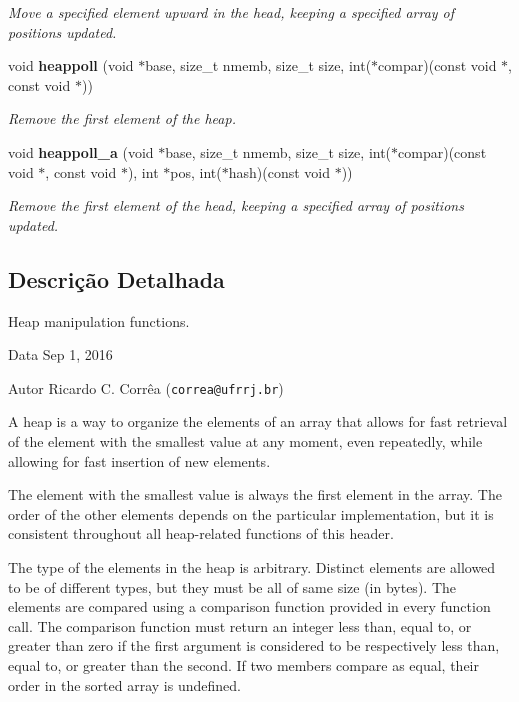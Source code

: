 \begin{DoxyCompactItemize}
\begin{DoxyCompactList}\small\item\em Move a specified element upward in the head, keeping a specified array of positions updated. \end{DoxyCompactList}\item 
void {\bf heappoll} (void $\ast$base, size\+\_\+t nmemb, size\+\_\+t size, int($\ast$compar)(const void $\ast$, const void $\ast$))
\begin{DoxyCompactList}\small\item\em Remove the first element of the heap. \end{DoxyCompactList}\item 
void {\bf heappoll\+\_\+a} (void $\ast$base, size\+\_\+t nmemb, size\+\_\+t size, int($\ast$compar)(const void $\ast$, const void $\ast$), int $\ast$pos, int($\ast$hash)(const void $\ast$))
\begin{DoxyCompactList}\small\item\em Remove the first element of the head, keeping a specified array of positions updated. \end{DoxyCompactList}\end{DoxyCompactItemize}


\subsection{Descrição Detalhada}
Heap manipulation functions. 

\begin{DoxyDate}{Data}
Sep 1, 2016 
\end{DoxyDate}
\begin{DoxyAuthor}{Autor}
Ricardo C. Corrêa ({\tt correa@ufrrj.\+br})
\end{DoxyAuthor}
A heap is a way to organize the elements of an array that allows for fast retrieval of the element with the smallest value at any moment, even repeatedly, while allowing for fast insertion of new elements.

The element with the smallest value is always the first element in the array. The order of the other elements depends on the particular implementation, but it is consistent throughout all heap-\/related functions of this header.

The type of the elements in the heap is arbitrary. Distinct elements are allowed to be of different types, but they must be all of same size (in bytes). The elements are compared using a comparison function provided in every function call. The comparison function must return an integer less than, equal to, or greater than zero if the first argument is considered to be respectively less than, equal to, or greater than the second. If two members compare as equal, their order in the sorted array is undefined.

